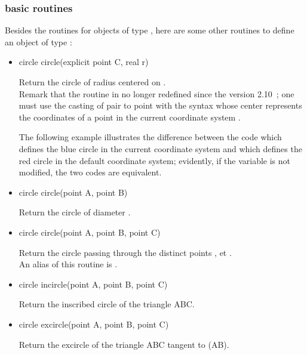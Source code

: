 \documentclass[pdftex]{article}
\begin{document}
\subsubsection{basic routines}
Besides the routines for objects of type , here are some
other routines to define an object of type :
\begin{itemize}
\item {}%
  \begin{Vcolor}
    circle circle(explicit point C, real r)
  \end{Vcolor}
  Return the circle of radius  centered on .\\
  Remark that the routine  in no
  longer redefined since the \asymptote version 2{.}10 ; one must use
  the casting of pair to point with the syntax 
  whose center  represents the coordinates of a point in the
  current coordinate system .

  The following example illustrates the difference between the code
   which defines the blue circle in the
  current coordinate system and
  which defines the red circle in the default coordinate system;
  evidently, if the variable  is not modified,
  the two codes are equivalent.
\item {}%
  \begin{Vcolor}
    circle circle(point A, point B)
  \end{Vcolor}
  Return the circle of diameter .
\item {}%
  \begin{Vcolor}
    circle circle(point A, point B, point C)
  \end{Vcolor}
  Return the circle passing through the distinct
  points ,  et .\\
  An alias of this routine is .
\item {}%
  \begin{Vcolor}
    circle incircle(point A, point B, point C)
  \end{Vcolor}
  Return the inscribed circle of the triangle ABC.
\item {}%
  \begin{Vcolor}
    circle excircle(point A, point B, point C)
  \end{Vcolor}
  Return the excircle of the triangle ABC tangent to (AB).
\end{itemize}
\end{document}
